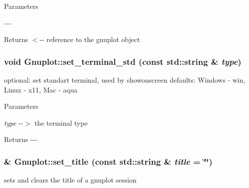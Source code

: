 \begin{DoxyParams}{Parameters}
\item[{\em -\/-\/-\/}]\end{DoxyParams}
\begin{DoxyReturn}{Returns}
$<$-\/-\/ reference to the gnuplot object 
\end{DoxyReturn}
\hypertarget{class_gnuplot_a21feba7a3916708b742c3dc25850ab2f}{
\subsubsection[{set\_\-terminal\_\-std}]{\setlength{\rightskip}{0pt plus 5cm}void Gnuplot::set\_\-terminal\_\-std (const std::string \& {\em type})}}
\label{class_gnuplot_a21feba7a3916708b742c3dc25850ab2f}
optional: set standart terminal, used by showonscreen defaults: Windows -\/ win, Linux -\/ x11, Mac -\/ aqua 
\begin{DoxyParams}{Parameters}
\item[{\em type}]-\/-\/$>$ the terminal type\end{DoxyParams}
\begin{DoxyReturn}{Returns}
-\/-\/-\/ 
\end{DoxyReturn}
\hypertarget{class_gnuplot_a4f93bac0e69dd83806652ca7226c6b3b}{
\subsubsection[{set\_\-title}]{\& Gnuplot::set\_\-title (const std::string \& {\em title} = {\ttfamily \char`\"{}\char`\"{}})}}
\label{class_gnuplot_a4f93bac0e69dd83806652ca7226c6b3b}


sets and clears the title of a gnuplot session 


